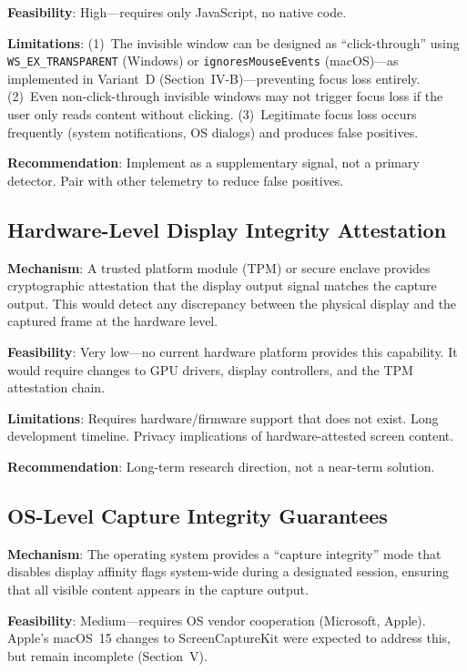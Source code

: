 \documentclass[conference]{IEEEtran}
\begin{document}
\textbf{Feasibility}: High---requires only JavaScript, no native code.

\textbf{Limitations}: (1)~The invisible window can be designed as ``click-through'' using \texttt{WS\_EX\_TRANSPARENT} (Windows) or \texttt{ignoresMouseEvents} (macOS)---as implemented in Variant~D (Section~IV-B)---preventing focus loss entirely. (2)~Even non-click-through invisible windows may not trigger focus loss if the user only reads content without clicking. (3)~Legitimate focus loss occurs frequently (system notifications, OS dialogs) and produces false positives.

\textbf{Recommendation}: Implement as a supplementary signal, not a primary detector. Pair with other telemetry to reduce false positives.

\subsection{Hardware-Level Display Integrity Attestation}

\textbf{Mechanism}: A trusted platform module (TPM) or secure enclave provides cryptographic attestation that the display output signal matches the capture output. This would detect any discrepancy between the physical display and the captured frame at the hardware level.

\textbf{Feasibility}: Very low---no current hardware platform provides this capability. It would require changes to GPU drivers, display controllers, and the TPM attestation chain.

\textbf{Limitations}: Requires hardware/firmware support that does not exist. Long development timeline. Privacy implications of hardware-attested screen content.

\textbf{Recommendation}: Long-term research direction, not a near-term solution.

\subsection{OS-Level Capture Integrity Guarantees}

\textbf{Mechanism}: The operating system provides a ``capture integrity'' mode that disables display affinity flags system-wide during a designated session, ensuring that all visible content appears in the capture output.

\textbf{Feasibility}: Medium---requires OS vendor cooperation (Microsoft, Apple). Apple's macOS~15 changes to ScreenCaptureKit were expected to address this, but remain incomplete (Section~V).
\end{document}

